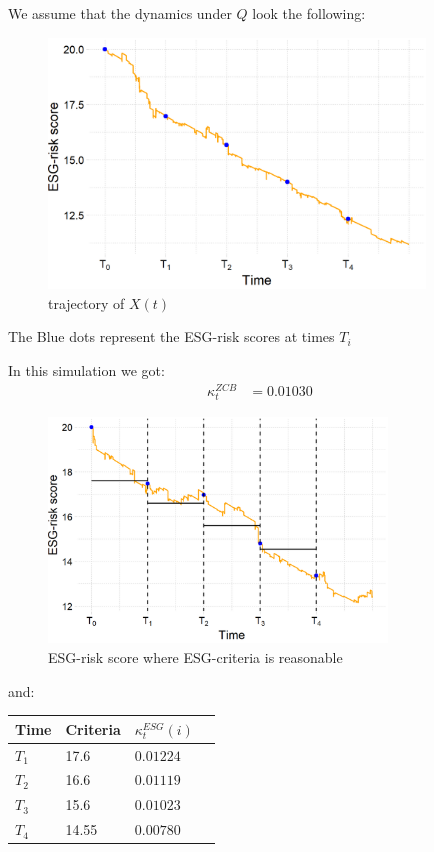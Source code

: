 We assume that the dynamics under $Q$ look the following: 
\begin{figure}[htp]
    \centering
    \includegraphics[width=10cm]{figures/ESG_OU_path.png}
    \caption{trajectory of $X(t)$}
    \label{fig: ESG-risk score}
\end{figure}

The Blue dots represent the ESG-risk scores at times $T_{i}$

\newpage 

In this simulation we got: 
\begin{align*}
\kappa_{t}^{ZCB} &= 0.01030    
\end{align*}

\begin{figure}[htp]
    \centering
    \includegraphics[width= 9cm]{figures/ESG_plt_criteria.png}
    \caption{ESG-risk score where ESG-criteria is reasonable}
    \label{fig: ESG-risk_criteria1}
\end{figure}

and: 
\begin{center}
    \begin{tabular}{ | l | l | l | p{5cm} |}
    \hline
    Time    &   Criteria  & $\kappa_{t}^{ESG}(i)$ \\ \hline
    $T_{1}$ &      17.6   & $0.01224$  \\ \hline
    $T_{2}$ &      16.6   & $0.01119$  \\ \hline
    $T_{3}$ &      15.6   & $0.01023$  \\ \hline
    $T_{4}$ &      14.55  & $0.00780$   \\ \hline
    \end{tabular}
\end{center} 

